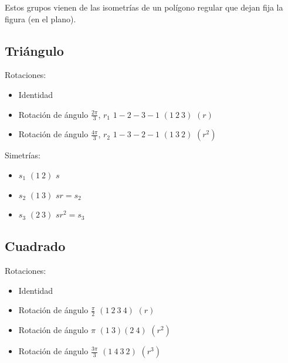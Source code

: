 Estos grupos vienen de las isometrías de un polígono regular que dejan fija la figura (en el plano).

\subsection{Triángulo}
\begin{center} %
\end{center}

Rotaciones: 
\begin{itemize}
    \item Identidad
    \item Rotación de ángulo $\frac{2\pi}{3}$, $r_1$ $1-2-3-1$ $(1\ 2\ 3)$ $(r)$
    \item Rotación de ángulo $\frac{4\pi}{3}$, $r_2$ $1-3-2-1$ $(1\ 3\ 2)$ $(r^2)$
\end{itemize}

Simetrías: %
\begin{itemize}
    \item $s_1$ $(1\ 2)$ $s$
    \item $s_2$ $(1\ 3)$ $sr = s_2$
    \item $s_3$ $(2\ 3)$ $sr^2=s_3$
\end{itemize}

\subsection{Cuadrado}

\begin{center} %
\end{center}

Rotaciones: 
\begin{itemize}
    \item Identidad
    \item Rotación de ángulo $\frac{\pi}{2}$ $(1\ 2\ 3\ 4)$ $(r)$
    \item Rotación de ángulo $\pi$ $(1\ 3)(2\ 4)$ $(r^2)$
    \item Rotación de ángulo $\frac{3\pi}{3}$ $(1\ 4\ 3\ 2)$ $(r^3)$
\end{itemize}

